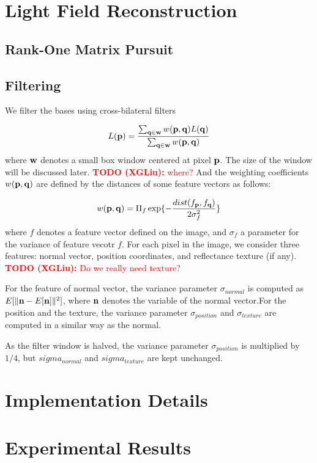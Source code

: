 \documentclass[review]{acmsiggraph}
\newcommand{\bfp}{{\bf p}}
\newcommand{\bfq}{{\bf q}}
\newcommand{\XGTODO}[1]{\textcolor{red}{{\bf TODO (XGLiu):} #1}}
\newcommand{\Equation}[1]{
	\begin{equation}
		#1
	\end{equation}
}
\begin{document}
\section{Light Field Reconstruction}

\subsection{Rank-One Matrix Pursuit}
\subsection{Filtering}

We filter the bases using cross-bilateral filters

\Equation{\nonumber
	L(\bfp)=\frac{\sum_{\bfq \in {\bf w}}w(\bfp,\bfq)L(\bfq)}
	{\sum_{\bfq \in {\bf w}}w(\bfp,\bfq)}
}%
where $\bf w$ denotes a small box window centered at pixel $\bfp$. The size of the window will be discussed later. \XGTODO{where?} And the weighting coefficients $w(\bfp,\bfq)$ are defined by the distances of some feature vectors as follows:
\Equation{\nonumber
	w(\bfp,\bfq)=\Pi_{f}\exp\{-\frac{dist(f_\bfp,f_\bfq)}{2\sigma_f^2}\} 
}%
where $f$ denotes a feature vector defined on the image, and $\sigma_f$ a parameter for the variance of feature vecotr $f$. For each pixel in the image, we consider three features: normal vector, position coordinates, and reflectance texture (if any). \XGTODO{Do we really need texture?}

For the feature of normal vector, the variance parameter $\sigma_{normal}$ is computed as $E[\|{\bf n}-E[{\bf n}] \|^2]$, where $\bf n$ denotes the variable of the normal vector.For the position and the texture, the variance parameter $\sigma_{position}$ and $\sigma_{texture}$ are computed in a similar way as the normal. 

As the filter window is halved, the variance parameter $\sigma_{position}$ is multiplied by $1/4$, but $sigma_{normal}$ and $sigma_{texture}$ are kept unchanged.

\section{Implementation Details}

\section{Experimental Results}
\end{document}
